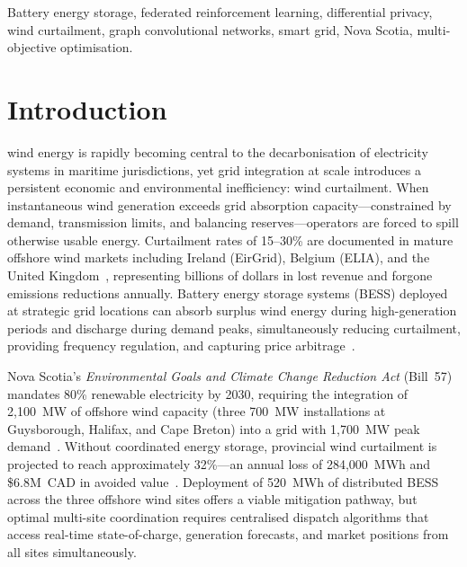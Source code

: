 \documentclass[journal]{IEEEtran}
\begin{document}
\begin{IEEEkeywords}
Battery energy storage, federated reinforcement learning, differential
privacy, wind curtailment, graph convolutional networks, smart grid,
Nova Scotia, multi-objective optimisation.
\end{IEEEkeywords}

\section{Introduction}

 wind energy is rapidly becoming central to the
decarbonisation of electricity systems in maritime jurisdictions, yet
grid integration at scale introduces a persistent economic and
environmental inefficiency: wind curtailment. When instantaneous wind
generation exceeds grid absorption capacity---constrained by demand,
transmission limits, and balancing reserves---operators are forced to
spill otherwise usable energy. Curtailment rates of 15--30\% are
documented in mature offshore wind markets including Ireland (EirGrid),
Belgium (ELIA), and the United Kingdom~\cite{elia2024,eirgrid2024},
representing billions of dollars in lost revenue and forgone emissions
reductions annually. Battery energy storage systems (BESS) deployed at
strategic grid locations can absorb surplus wind energy during
high-generation periods and discharge during demand peaks,
simultaneously reducing curtailment, providing frequency regulation,
and capturing price arbitrage~\cite{denholm2010,zakeri2015}.

Nova Scotia's \textit{Environmental Goals and Climate Change Reduction
Act} (Bill~57)~\cite{nsbill57} mandates 80\% renewable electricity by
2030, requiring the integration of 2,100~MW of offshore wind capacity
(three 700~MW installations at Guysborough, Halifax, and Cape Breton)
into a grid with 1,700~MW peak demand~\cite{nspower2023}. Without
coordinated energy storage, provincial wind curtailment is projected to
reach approximately 32\%---an annual loss of 284,000~MWh and \$6.8M~CAD
in avoided value~\cite{nrebill57stats}. Deployment of 520~MWh of
distributed BESS across the three offshore wind sites offers a viable
mitigation pathway, but optimal multi-site coordination requires
centralised dispatch algorithms that access real-time state-of-charge,
generation forecasts, and market positions from all sites simultaneously.
\end{document}
